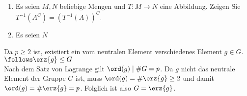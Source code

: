 \begin{exercisePage}
%
%

\begin{exercise}
	\begin{enumerate}
		\item Es seien $M,N$ beliebige Mengen und $T: M \to N$ eine Abbildung. Zeigen Sie $T^{-1}(A^C) = (T^{-1}(A))^C$.
		\item Es seien $N$
	\end{enumerate}
\end{exercise}

\begin{solution}
	Da $p \geq 2$ ist, existiert ein vom neutralen Element verschiedenes Element $g \in G$. \\
	$\follows \erz{g} \leq G$ \\
	Nach dem Satz von Lagrange gilt $\ord(g) \mid \# G = p$. Da $g$ nicht das neutrale Element der Gruppe $G$ ist, muss $\ord(g) = \# \erz{g} \geq 2$  und damit $\ord(g) = \# \erz{g} = p$. Folglich ist also $G = \erz{g}$.
\end{solution}

\end{exercisePage}